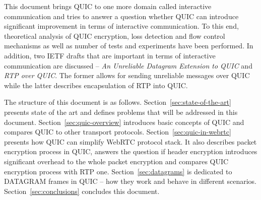 This document brings QUIC to one more domain called interactive communication and tries to answer a question whether QUIC can introduce significant improvement in terms of interactive communication.
To this end, theoretical analysis of QUIC encryption, loss detection and flow control mechanisms as well as number of tests and experiments have been performed.
In addition, two IETF drafts that are important in terms of interactive communication are discussed -- \textit{An Unreliable Datagram Extension to QUIC} and \textit{RTP over QUIC}.
The former allows for sending unreliable messages over QUIC while the latter describes encapsulation of RTP into QUIC\@.

The structure of this document is as follows.
Section~\ref{sec:state-of-the-art} presents state of the art and defines problems that will be addressed in this document.
Section~\ref{sec:quic-overview} introduces basic concepts of QUIC and compares QUIC to other transport protocols.
Section~\ref{sec:quic-in-webrtc} presents how QUIC can simplify WebRTC protocol stack.
It also describes packet encryption process in QUIC, answers the question if header encryption introduces significant overhead to the whole packet encryption and compares QUIC encryption process with RTP one.
Section~\ref{sec:datagrams} is dedicated to DATAGRAM frames in QUIC -- how they work and behave in different scenarios.
Section~\ref{sec:conclusions} concludes this document.
